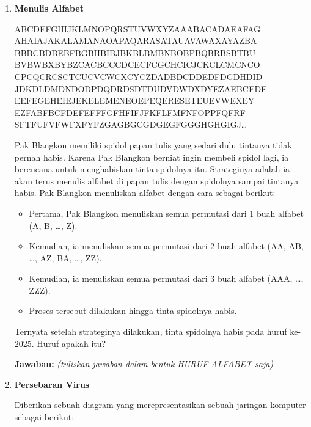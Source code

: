 \documentclass[a4paper,11pt]{article}
\begin{document}
\begin{enumerate}
  \item \textbf{Menulis Alfabet}
  \begin{center}
    \begin{tcolorbox}[enhanced, width=0.55\textwidth]
\ttfamily\noindent\centering\large
ABCDEFGHIJKLMNOPQRSTUVWXYZAAABACADAEAFAG
AHAIAJAKALAMANAOAPAQARASATAUAVAWAXAYAZBA
BBBCBDBEBFBGBHBIBJBKBLBMBNBOBPBQBRBSBTBU
BVBWBXBYBZCACBCCCDCECFCGCHCICJCKCLCMCNCO
CPCQCRCSCTCUCVCWCXCYCZDADBDCDDEDFDGDHDID
JDKDLDMDNDODPDQDRDSDTDUDVDWDXDYEZAEBCEDE
EEFEGEHEIEJEKELEMENEOEPEQERESETEUEVWEXEY
EZFABFBCFDEFEFFFGFHFIFJFKFLFMFNFOPPFQFRF
SFTFUFVFWFXFYFZGAGBGCGDGEGFGGGHGHGIGJ\ldots
\end{tcolorbox}
  \end{center}


Pak Blangkon memiliki spidol papan tulis yang sedari dulu tintanya tidak pernah habis. Karena Pak Blangkon 
berniat ingin membeli spidol lagi, ia berencana untuk menghabiskan tinta spidolnya itu. Strateginya adalah ia 
akan terus menulis alfabet di papan tulis dengan spidolnya sampai tintanya habis. Pak Blangkon menuliskan 
alfabet dengan cara sebagai berikut:

\begin{itemize}
    \item Pertama, Pak Blangkon menuliskan semua permutasi dari 1 buah alfabet (A, B, \ldots, Z).
    \item Kemudian, ia menuliskan semua permutasi dari 2 buah alfabet (AA, AB, \ldots, AZ, BA, \ldots, ZZ).
    \item Kemudian, ia menuliskan semua permutasi dari 3 buah alfabet (AAA, \ldots, ZZZ).
    \item Proses tersebut dilakukan hingga tinta spidolnya habis.
\end{itemize}

Ternyata setelah strateginya dilakukan, tinta spidolnya habis pada huruf ke-2025. Huruf apakah itu?

\textbf{Jawaban:} \underline{\hspace{2cm}} \quad \emph{(tuliskan jawaban dalam bentuk HURUF ALFABET saja)}

\item \textbf{Persebaran Virus}

Diberikan sebuah diagram yang merepresentasikan sebuah jaringan komputer sebagai berikut:
\begin{center}
\begin{tikzpicture}[>=Stealth, node distance=1cm, every node/.style={circle, draw, minimum size=0.5cm}, thick,font=\small\sffamily]


\end{tikzpicture}
\end{center}
\end{enumerate}
\end{document}
